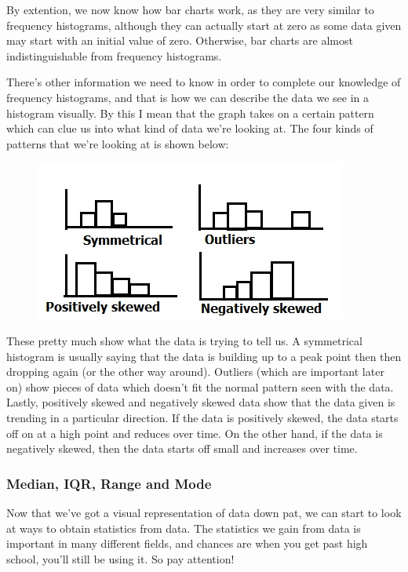 \documentclass[11pt]{article}
\begin{document}
By extention, we now know how bar charts work, as they are very similar to frequency histograms, although they can actually start at zero as some data given may start with an initial value of zero. Otherwise, bar charts are almost indistinguishable from frequency histograms.

There's other information we need to know in order to complete our knowledge of frequency histograms, and that is how we can describe the data we see in a histogram visually. By this I mean that the graph takes on a certain pattern which can clue us into what kind of data we're looking at. The four kinds of patterns that we're looking at is shown below:

\begin{figure}[htp]
\centering
\includegraphics[scale=1.00]{SkewedImage6.jpg}
\end{figure}

These pretty much show what the data is trying to tell us. A symmetrical histogram is usually saying that the data is building up to a peak point then then dropping again (or the other way around). Outliers (which are important later on) show pieces of data which doesn't fit the normal pattern seen with the data. Lastly, positively skewed and negatively skewed data show that the data given is trending in a particular direction. If the data is positively skewed, the data starts off on at a high point and reduces over time. On the other hand, if the data is negatively skewed, then the data starts off small and increases over time.

\subsubsection*{Median, IQR, Range and Mode}
Now that we've got a visual representation of data down pat, we can start to look at ways to obtain statistics from data. The statistics we gain from data is important in many different fields, and chances are when you get past high school, you'll still be using it. So pay attention!
\end{document}
